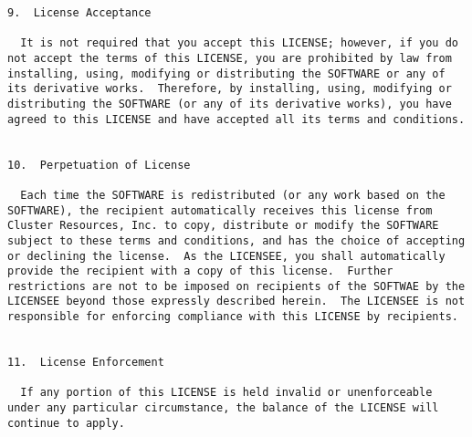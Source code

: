 \begin{verbatim}
9.  License Acceptance

  It is not required that you accept this LICENSE; however, if you do
not accept the terms of this LICENSE, you are prohibited by law from
installing, using, modifying or distributing the SOFTWARE or any of
its derivative works.  Therefore, by installing, using, modifying or
distributing the SOFTWARE (or any of its derivative works), you have
agreed to this LICENSE and have accepted all its terms and conditions.


10.  Perpetuation of License

  Each time the SOFTWARE is redistributed (or any work based on the
SOFTWARE), the recipient automatically receives this license from
Cluster Resources, Inc. to copy, distribute or modify the SOFTWARE
subject to these terms and conditions, and has the choice of accepting
or declining the license.  As the LICENSEE, you shall automatically
provide the recipient with a copy of this license.  Further
restrictions are not to be imposed on recipients of the SOFTWAE by the
LICENSEE beyond those expressly described herein.  The LICENSEE is not
responsible for enforcing compliance with this LICENSE by recipients.


11.  License Enforcement 

  If any portion of this LICENSE is held invalid or unenforceable
under any particular circumstance, the balance of the LICENSE will
continue to apply.
\end{verbatim}
